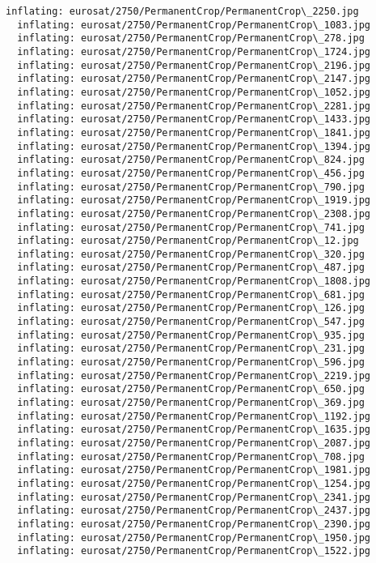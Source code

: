 \documentclass[11pt]{article}
\begin{document}
\begin{Verbatim}[commandchars=\\\{\}]
  inflating: eurosat/2750/PermanentCrop/PermanentCrop\_2250.jpg
  inflating: eurosat/2750/PermanentCrop/PermanentCrop\_1083.jpg
  inflating: eurosat/2750/PermanentCrop/PermanentCrop\_278.jpg
  inflating: eurosat/2750/PermanentCrop/PermanentCrop\_1724.jpg
  inflating: eurosat/2750/PermanentCrop/PermanentCrop\_2196.jpg
  inflating: eurosat/2750/PermanentCrop/PermanentCrop\_2147.jpg
  inflating: eurosat/2750/PermanentCrop/PermanentCrop\_1052.jpg
  inflating: eurosat/2750/PermanentCrop/PermanentCrop\_2281.jpg
  inflating: eurosat/2750/PermanentCrop/PermanentCrop\_1433.jpg
  inflating: eurosat/2750/PermanentCrop/PermanentCrop\_1841.jpg
  inflating: eurosat/2750/PermanentCrop/PermanentCrop\_1394.jpg
  inflating: eurosat/2750/PermanentCrop/PermanentCrop\_824.jpg
  inflating: eurosat/2750/PermanentCrop/PermanentCrop\_456.jpg
  inflating: eurosat/2750/PermanentCrop/PermanentCrop\_790.jpg
  inflating: eurosat/2750/PermanentCrop/PermanentCrop\_1919.jpg
  inflating: eurosat/2750/PermanentCrop/PermanentCrop\_2308.jpg
  inflating: eurosat/2750/PermanentCrop/PermanentCrop\_741.jpg
  inflating: eurosat/2750/PermanentCrop/PermanentCrop\_12.jpg
  inflating: eurosat/2750/PermanentCrop/PermanentCrop\_320.jpg
  inflating: eurosat/2750/PermanentCrop/PermanentCrop\_487.jpg
  inflating: eurosat/2750/PermanentCrop/PermanentCrop\_1808.jpg
  inflating: eurosat/2750/PermanentCrop/PermanentCrop\_681.jpg
  inflating: eurosat/2750/PermanentCrop/PermanentCrop\_126.jpg
  inflating: eurosat/2750/PermanentCrop/PermanentCrop\_547.jpg
  inflating: eurosat/2750/PermanentCrop/PermanentCrop\_935.jpg
  inflating: eurosat/2750/PermanentCrop/PermanentCrop\_231.jpg
  inflating: eurosat/2750/PermanentCrop/PermanentCrop\_596.jpg
  inflating: eurosat/2750/PermanentCrop/PermanentCrop\_2219.jpg
  inflating: eurosat/2750/PermanentCrop/PermanentCrop\_650.jpg
  inflating: eurosat/2750/PermanentCrop/PermanentCrop\_369.jpg
  inflating: eurosat/2750/PermanentCrop/PermanentCrop\_1192.jpg
  inflating: eurosat/2750/PermanentCrop/PermanentCrop\_1635.jpg
  inflating: eurosat/2750/PermanentCrop/PermanentCrop\_2087.jpg
  inflating: eurosat/2750/PermanentCrop/PermanentCrop\_708.jpg
  inflating: eurosat/2750/PermanentCrop/PermanentCrop\_1981.jpg
  inflating: eurosat/2750/PermanentCrop/PermanentCrop\_1254.jpg
  inflating: eurosat/2750/PermanentCrop/PermanentCrop\_2341.jpg
  inflating: eurosat/2750/PermanentCrop/PermanentCrop\_2437.jpg
  inflating: eurosat/2750/PermanentCrop/PermanentCrop\_2390.jpg
  inflating: eurosat/2750/PermanentCrop/PermanentCrop\_1950.jpg
  inflating: eurosat/2750/PermanentCrop/PermanentCrop\_1522.jpg

\end{Verbatim}
\end{document}

